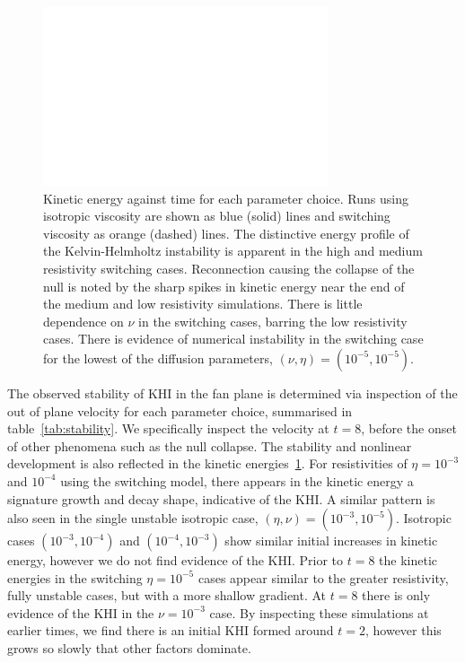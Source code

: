 \begin{figure}[h]
  \centering
  \includegraphics[width=\linewidth]{param_study/kinetic_energies.pdf}
  \caption{Kinetic energy against time for each parameter choice. Runs using isotropic viscosity are shown as blue (solid) lines and switching viscosity as orange (dashed) lines. The distinctive energy profile of the Kelvin-Helmholtz instability is apparent in the high and medium resistivity switching cases. Reconnection causing the collapse of the null is noted by the sharp spikes in kinetic energy near the end of the medium and low resistivity simulations. There is little dependence on $\nu$ in the switching cases, barring the low resistivity cases. There is evidence of numerical instability in the switching case for the lowest of the diffusion parameters, $(\nu, \eta) = (10^{-5}, 10^{-5})$.}%
  \label{fig:param_study_kinetic_energies}
\end{figure}

The observed stability of KHI in the fan plane is determined via inspection of the out of plane velocity for each parameter choice, summarised in table~\ref{tab:stability}. We specifically inspect the velocity at $t=8$, before the onset of other phenomena such as the null collapse. The stability and nonlinear development is also reflected in the kinetic energies~\ref{fig:param_study_kinetic_energies}. For resistivities of $\eta = 10^{-3}$ and $10^{-4}$ using the switching model, there appears in the kinetic energy a signature growth and decay shape, indicative of the KHI. A similar pattern is also seen in the single unstable isotropic case, $(\eta, \nu) = (10^{-3}, 10^{-5})$. Isotropic cases $(10^{-3}, 10^{-4})$ and $(10^{-4}, 10^{-3})$ show similar initial increases in kinetic energy, however we do not find evidence of the KHI. Prior to $t = 8$ the kinetic energies in the switching $\eta=10^{-5}$ cases appear similar to the greater resistivity, fully unstable cases, but with a more shallow gradient. At $t=8$ there is only evidence of the KHI in the $\nu=10^{-3}$ case. By inspecting these simulations at earlier times, we find there is an initial KHI formed around $t=2$, however this grows so slowly that other factors dominate.

